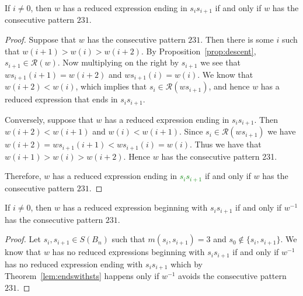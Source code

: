 \begin{lemma}\label{lem:ts}
If $i \neq 0$, then $w$ has a reduced expression ending in $s_is_{i+1}$ if and only if $w$ has the consecutive pattern $231$.
\begin{proof}	
	Suppose that $w$ has the consecutive pattern $231$. Then there is some $i$ such that $w(i+1)>w(i)>w(i+2)$. By Proposition~\ref{prop:descent}, $s_{i+1} \in \mathcal{R}(w)$. Now multiplying on the right by $s_{i+1}$ we see that $ws_{i+1}(i+1)=w(i+2)$ and $ws_{i+1}(i)=w(i)$. We know that $w(i+2)<w(i)$, which implies that $s_i \in \mathcal{R}(ws_{i+1})$, and hence $w$ has a reduced expression that ends in $s_is_{i+1}$.
	
	 Conversely, suppose that $w$ has a reduced expression ending in $s_is_{i+1}$. Then $w(i+2)<w(i+1)$ and $w(i)<w(i+1)$. Since $s_i \in \mathcal{R}(ws_{i+1})$ we have $w(i+2)=ws_{i+1}(i+1)<ws_{i+1}(i)=w(i)$. Thus we have that $w(i+1) > w(i) > w(i+2)$. Hence $w$ has the consecutive pattern 231.
	
	Therefore, $w$ has a reduced expression ending in \textcolor{green}{$s_is_{i+1}$} if and only if $w$ has the consecutive pattern $231$.
\end{proof}	
\end{lemma}

\begin{corollary}\label{lem:endswithst}
	If $i \neq 0$, then $w$ has a reduced expression beginning with $s_is_{i+1}$ if and only if $w^{-1}$ has the consecutive pattern $231$.
	\begin{proof}
		Let $s_i,s_{i+1} \in S(B_n)$ such that $m(s_i,s_{i+1})=3$ and $s_0 \notin\{s_i,s_{i+1}\}$. We know that $w$ has no reduced expressions beginning with $s_is_{i+1}$ if and only if $w^{-1}$ has no reduced expression ending with $s_is_{i+1}$ which by Theorem~\ref{lem:endswithsts} happens only if $w^{-1}$ avoids the consecutive pattern $231$.
	\end{proof}
\end{corollary}

